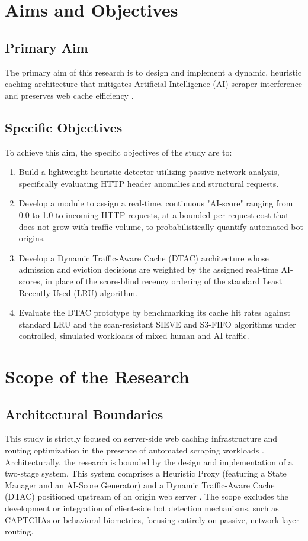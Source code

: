 \section{Aims and Objectives}

\subsection{Primary Aim}
The primary aim of this research is to design and implement a dynamic, heuristic caching architecture that mitigates Artificial Intelligence (AI) scraper interference and preserves web cache efficiency \cite{zhang_rethinking_2026}.

\subsection{Specific Objectives}
To achieve this aim, the specific objectives of the study are to:
\begin{enumerate}
    \item Build a lightweight heuristic detector utilizing passive network analysis, specifically evaluating HTTP header anomalies and structural requests.
    \item Develop a module to assign a real-time, continuous "AI-score" ranging from 0.0 to 1.0 to incoming HTTP requests, at a bounded per-request cost that does not grow with traffic volume, to probabilistically quantify automated bot origins.
    \item Develop a Dynamic Traffic-Aware Cache (DTAC) architecture whose admission and eviction decisions are weighted by the assigned real-time AI-scores, in place of the score-blind recency ordering of the standard Least Recently Used (LRU) algorithm.
    \item Evaluate the DTAC prototype by benchmarking its cache hit rates against standard LRU and the scan-resistant SIEVE and S3-FIFO algorithms under controlled, simulated workloads of mixed human and AI traffic.
\end{enumerate}

\section{Scope of the Research}

\subsection{Architectural Boundaries}
This study is strictly focused on server-side web caching infrastructure and routing optimization in the presence of automated scraping workloads \cite{umar_experimental_2026, zhang_rethinking_2026}. Architecturally, the research is bounded by the design and implementation of a two-stage system. This system comprises a Heuristic Proxy (featuring a State Manager and an AI-Score Generator) and a Dynamic Traffic-Aware Cache (DTAC) positioned upstream of an origin web server \cite{van_boxem_shy_2026, zhang_rethinking_2026}. The scope excludes the development or integration of client-side bot detection mechanisms, such as CAPTCHAs or behavioral biometrics, focusing entirely on passive, network-layer routing.

